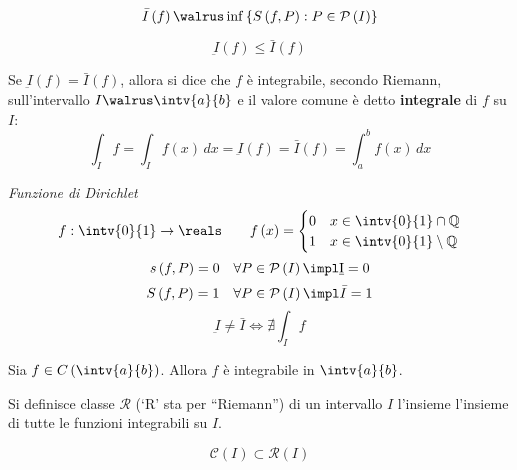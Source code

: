 \begin{definition}
  $$\bar{I}\left( f \right)\walrus \inf\left\{ S\left( f,P \right):P\in \mathcal{P}\left( I \right) \right\}$$
\end{definition}

\begin{observation}
  $$\underbar{I}\left( f \right)\le \bar{I}\left( f \right)$$
\end{observation}

\begin{definition}
  Se $\underbar{I}\left( f \right)=\bar{I}\left( f \right)$, allora si dice che $f$ è integrabile, secondo Riemann, sull'intervallo $I\walrus\intv{a}{b}$ e il valore comune è detto \textbf{integrale} di $f$ su $I$:
  $$\int_If=\int_If\left( x \right)\,dx=\underbar{I}\left( f \right)=\bar{I}\left( f \right)=\int_a^bf\left( x \right)\,dx$$
\end{definition}

\begin{example}
  \emph{Funzione di Dirichlet}
  $$
    f:\intv{0}{1}\to\reals\qquad f\left( x \right)=
    \begin{cases}
      0 & x\in\intv{0}{1}\cap\mathbb{Q}      \\
      1 & x\in\intv{0}{1}\setminus\mathbb{Q} \\
    \end{cases}
  $$
  $$s\left( f,P \right)=0\quad \forall P\in\mathcal{P}\left( I \right)\impl \underbar{I}=0$$
  $$S\left( f,P \right)=1\quad \forall P\in\mathcal{P}\left( I \right)\impl \bar{I}=1$$
  $$\underbar{I}\neq\bar{I}\iff \nexists \int_If$$
\end{example}

\begin{theorem}
  Sia $f\in C\left( \intv{a}{b} \right)$. Allora $f$ è integrabile in $\intv{a}{b}$.
\end{theorem}

\begin{definition}
  Si definisce classe $\mathcal{R}$ (`R' sta per ``Riemann'') di un intervallo $I$ l'insieme l'insieme di tutte le funzioni integrabili su $I$.
\end{definition}

\begin{observation}
  $$\mathcal{C}\left( I \right)\subset\mathcal{R}\left( I \right)$$
\end{observation}

